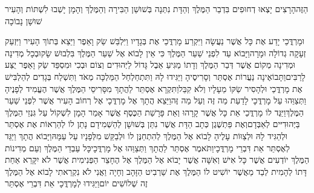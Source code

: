 \documentclass[../main/main.tex]{subfiles}
\begin{document}
\begin{multicols*}{\ncols}
הַזֶּה\PreVerseSpace{}הָרָצִים יָצְאוּ דְחוּפִים בִּדְבַר הַמֶּלֶךְ וְהַדָּת נִתְּנָה בְּשׁוּשַׁן הַבִּירָה וְהַמֶּלֶךְ וְהָמָן יָשְׁבוּ לִשְׁתּוֹת וְהָעִיר שׁוּשָׁן נָבוֹכָה\OpenSection{}\par
{}וּמָרְדֳּכַי יָדַע אֶת כָּל אֲשֶׁר נַעֲשָׂה וַיִּקְרַע מָרְדֳּכַי אֶת בְּגָדָיו וַיִּלְבַּשׁ שַׂק וָאֵפֶר וַיֵּצֵא בְּתוֹךְ הָעִיר וַיִּזְעַק זְעָקָה גְדוֹלָה וּמָרָה\PreVerseSpace{}וַיָּבוֹא עַד לִפְנֵי שַׁעַר הַמֶּלֶךְ כִּי אֵין לָבוֹא אֶל שַׁעַר הַמֶּלֶךְ בִּלְבוּשׁ שָׂק\PreVerseSpace{}וּבְכָל מְדִינָה וּמְדִינָה מְקוֹם אֲשֶׁר דְּבַר הַמֶּלֶךְ וְדָתוֹ מַגִּיעַ אֵבֶל גָּדוֹל לַיְּהוּדִים וְצוֹם וּבְכִי וּמִסְפֵּד שַׂק וָאֵפֶר יֻצַּע לָרַבִּים\PreVerseSpace{}וַתָּבוֹאֶינָה נַעֲרוֹת אֶסְתֵּר וְסָרִיסֶיהָ וַיַּגִּידוּ לָהּ וַתִּתְחַלְחַל הַמַּלְכָּה מְאֹד וַתִּשְׁלַח בְּגָדִים לְהַלְבִּישׁ אֶת מָרְדֳּכַי וּלְהָסִיר שַׂקּוֹ מֵעָלָיו וְלֹא קִבֵּל\PreVerseSpace{}וַתִּקְרָא אֶסְתֵּר לַהֲתָךְ מִסָּרִיסֵי הַמֶּלֶךְ אֲשֶׁר הֶעֱמִיד לְפָנֶיהָ וַתְּצַוֵּהוּ עַל מָרְדֳּכָי לָדַעַת מַה זֶּה וְעַל מַה זֶּה\PreVerseSpace{}וַיֵּצֵא הֲתָךְ אֶל מָרְדֳּכָי אֶל רְחוֹב הָעִיר אֲשֶׁר לִפְנֵי שַׁעַר הַמֶּלֶךְ\PreVerseSpace{}וַיַּגֶּד לוֹ מָרְדֳּכַי אֵת כָּל אֲשֶׁר קָרָהוּ וְאֵת פָּרָשַׁת הַכֶּסֶף אֲשֶׁר אָמַר הָמָן לִשְׁקוֹל עַל גִּנְזֵי הַמֶּלֶךְ בַּיְּהוּדִיּים לְאַבְּדָם\PreVerseSpace{}וְאֶת פַּתְשֶׁגֶן כְּתָב הַדָּת אֲשֶׁר נִתַּן בְּשׁוּשָׁן לְהַשְׁמִידָם נָתַן לוֹ לְהַרְאוֹת אֶת אֶסְתֵּר וּלְהַגִּיד לָהּ וּלְצַוּוֹת עָלֶיהָ לָבוֹא אֶל הַמֶּלֶךְ לְהִתְחַנֶּן לוֹ וּלְבַקֵּשׁ מִלְּפָנָיו עַל עַמָּהּ\PreVerseSpace{}וַיָּבוֹא הֲתָךְ וַיַּגֵּד לְאֶסְתֵּר אֵת דִּבְרֵי מָרְדֳּכָי\PreVerseSpace{}וַתֹּאמֶר אֶסְתֵּר לַהֲתָךְ וַתְּצַוֵּהוּ אֶל מָרְדֳּכָי\PreVerseSpace{}כָּל עַבְדֵי הַמֶּלֶךְ וְעַם מְדִינוֹת הַמֶּלֶךְ יוֹדְעִים אֲשֶׁר כָּל אִישׁ וְאִשָּׁה אֲשֶׁר יָבוֹא אֶל הַמֶּלֶךְ אֶל הֶחָצֵר הַפְּנִימִית אֲשֶׁר לֹא יִקָּרֵא אַחַת דָּתוֹ לְהָמִית לְבַד מֵאֲשֶׁר יוֹשִׁיט לוֹ הַמֶּלֶךְ אֶת שַׁרְבִיט הַזָּהָב וְחָיָה וַאֲנִי לֹא נִקְרֵאתִי לָבוֹא אֶל הַמֶּלֶךְ זֶה שְׁלוֹשִׁים יוֹם\PreVerseSpace{}וַיַּגִּידוּ לְמָרְדֳּכָי אֵת דִּבְרֵי אֶסְתֵּר\OpenSection{}\par

\end{multicols*}
\end{document}
